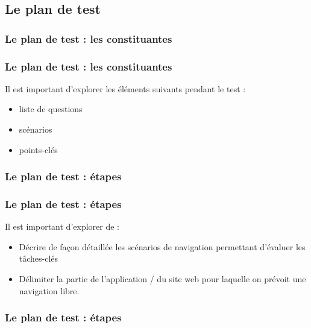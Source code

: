		\subsection{Le plan de test}  
		\subsubsection{Le plan de test : les constituantes} 

		\begin{frame}[allowframebreaks]
			\frametitle{Le plan de test : les constituantes}
			Il est important d'explorer les éléments suivants pendant le test :
			\begin {itemize}
				      \item liste de questions
				      \item scénarios
				      \item points-clés
			\end{itemize}
		\end{frame} 

	\subsubsection{Le plan de test : étapes} 

		\begin{frame}[allowframebreaks]
			\frametitle{Le plan de test : étapes}
			Il est important d'explorer de :
			\begin {itemize}
				      \item Décrire de façon détaillée les scénarios de navigation permettant d'évaluer les tâches-clés
				      \item Délimiter la partie de l'application / du site web pour laquelle on prévoit une navigation libre.
			\end{itemize}
		\end{frame} 

	\subsubsection{Le plan de test : étapes} 

